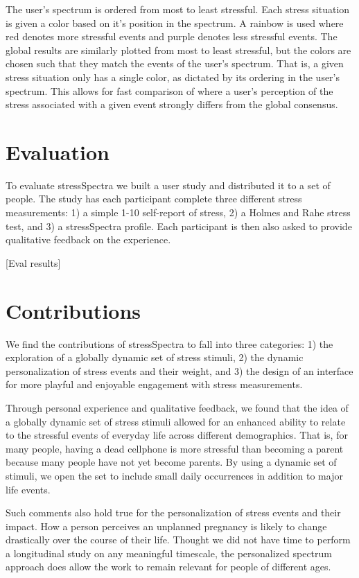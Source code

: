 \documentclass{sigchi}
\begin{document}
The user’s spectrum is ordered from most to least stressful. Each stress situation is given a color based on it’s position in the spectrum. A rainbow is used where red denotes more stressful events and purple denotes less stressful events. The global results are similarly plotted from most to least stressful, but the colors are chosen such that they match the events of the user’s spectrum. That is, a given stress situation only has a single color, as dictated by its ordering in the user’s spectrum. This allows for fast comparison of where a user’s perception of the stress associated with a given event strongly differs from the global consensus. 

\section{Evaluation}
To evaluate stressSpectra we built a user study and distributed it to a set of people. The study has each participant complete three different stress measurements: 1) a simple 1-10 self-report of stress, 2) a Holmes and Rahe stress test, and 3) a stressSpectra profile. Each participant is then also asked to provide qualitative feedback on the experience. 

[Eval results]




\section{Contributions}
We find the contributions of stressSpectra to fall into three categories: 1) the exploration of a globally dynamic set of stress stimuli, 2) the dynamic personalization of stress events and their weight, and 3) the design of an interface for more playful and enjoyable engagement with stress measurements.

Through personal experience and qualitative feedback, we found that the idea of a globally dynamic set of stress stimuli allowed for an enhanced ability to relate to the stressful events of everyday life across different demographics. That is, for many people, having a dead cellphone is more stressful than becoming a parent because many people have not yet become parents. By using a dynamic set of stimuli, we open the set to include small daily occurrences in addition to major life events. 

Such comments also hold true for the personalization of stress events and their impact. How a person perceives an unplanned pregnancy is likely to change drastically over the course of their life. Thought we did not have time to perform a longitudinal study on any meaningful timescale, the personalized spectrum approach does allow the work to remain relevant for people of different ages. 
\end{document}
